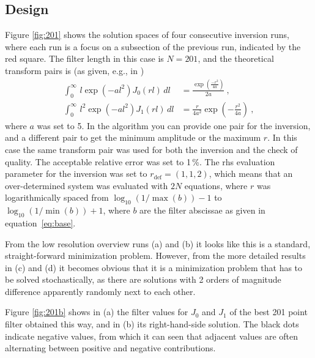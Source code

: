 \documentclass[paper,twocolumn,twoside]{geophysics}
\newcommand{\mr}[1]{\mathrm{#1}}
\begin{document}
\subsection{Design}
Figure \ref{fig:201} shows the solution spaces of four consecutive inversion
runs, where each run is a focus on a subsection of the previous run, indicated
by the red square.
%
%
%
The filter length in this case is $N=201$, and the theoretical transform pairs
is (as given, e.g., in \cite{USGS.75.Anderson})
%
\begin{align}
  \int^\infty_0\,l \exp\left(-al^2\right) J_0(rl)\,dl &=
  \frac{\exp\left(\frac{-r^2}{4a}\right)}{2a}\ , \\
  \int^\infty_0\,l^2 \exp\left(-al^2\right) J_1(rl)\,dl &=
  \frac{r}{4a^2} \exp\left(-\frac{r^2}{4a}\right)\ ,
  \label{eq:j01}
\end{align}
%
where $a$ was set to 5. In the algorithm you can provide one pair for the inversion, and a different pair to get the minimum amplitude or the maximum $r$. In
this case the same transform pair was used for both the inversion and the check
of quality. The acceptable relative error was set to 1\,\%.
The rhs evaluation parameter for the inversion was set to $r_\mr{def} = (1, 1,
2)$, which means that an over-determined system was evaluated with $2N$
equations, where $r$ was logarithmically spaced from $\log_{10}(1/\max(b)) - 1$
to $\log_{10}(1/\min(b)) + 1$, where $b$ are the filter abscissae as given in
equation~\ref{eq:base}.

From the low resolution overview runs (a) and (b) it looks like this is a
standard, straight-forward minimization problem. However, from the more
detailed results in (c) and (d) it becomes obvious that it is a minimization
problem that has to be solved stochastically, as there are solutions with 2
orders of magnitude difference apparently randomly next to each other.

Figure \ref{fig:201b} shows in (a) the filter values for $J_0$ and $J_1$ of the
best 201 point filter obtained this way, and in (b) its right-hand-side
solution. The black dots indicate negative values, from which it can seen that
adjacent values are often alternating between positive and negative
contributions.
%
%
\end{document}
